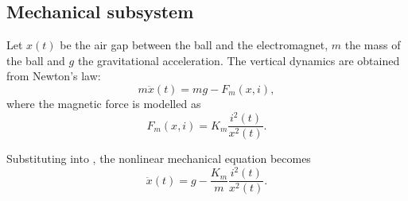 \subsection{Mechanical subsystem}

Let $x(t)$ be the air gap between the ball and the electromagnet, $m$ the mass of the ball and $g$ the gravitational acceleration. The vertical dynamics are obtained from Newton's law:
\begin{equation}
    m\ddot{x}(t) = mg - F_m(x,i),
    \label{eq:newton}
\end{equation}
where the magnetic force is modelled as
\begin{equation}
    F_m(x,i) = K_m \frac{i^2(t)}{x^2(t)}.
    \label{eq:magnetic_force}
\end{equation}

Substituting  into , the nonlinear mechanical equation becomes
\begin{equation}
    \ddot{x}(t) = g - \frac{K_m}{m}\frac{i^2(t)}{x^2(t)}.
    \label{eq:mechanical_nonlinear}
\end{equation}
